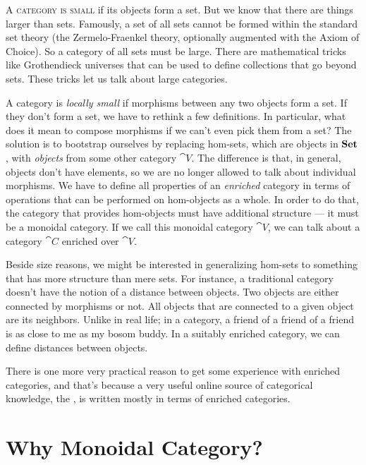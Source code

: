
\lettrine[lhang=0.17]{A}{ category is small} if its objects form a set. But we know that
there are things larger than sets. Famously, a set of all sets cannot be
formed within the standard set theory (the Zermelo-Fraenkel theory,
optionally augmented with the Axiom of Choice). So a category of all
sets must be large. There are mathematical tricks like Grothendieck
universes that can be used to define collections that go beyond sets.
These tricks let us talk about large categories.

A category is \emph{locally small} if morphisms between any two objects
form a set. If they don't form a set, we have to rethink a few
definitions. In particular, what does it mean to compose morphisms if we
can't even pick them from a set? The solution is to bootstrap ourselves
by replacing hom-sets, which are objects in $\mathbf{Set}$, with
\emph{objects} from some other category $\cat{V}$. The difference is
that, in general, objects don't have elements, so we are no longer
allowed to talk about individual morphisms. We have to define all
properties of an \emph{enriched} category in terms of operations that
can be performed on hom-objects as a whole. In order to do that, the
category that provides hom-objects must have additional structure --- it
must be a monoidal category. If we call this monoidal category $\cat{V}$,
we can talk about a category $\cat{C}$ enriched over $\cat{V}$.

Beside size reasons, we might be interested in generalizing hom-sets to
something that has more structure than mere sets. For instance, a
traditional category doesn't have the notion of a distance between
objects. Two objects are either connected by morphisms or not. All
objects that are connected to a given object are its neighbors. Unlike
in real life; in a category, a friend of a friend of a friend is as
close to me as my bosom buddy. In a suitably enriched category, we can
define distances between objects.

There is one more very practical reason to get some experience with
enriched categories, and that's because a very useful online source of
categorical knowledge, the , is written
mostly in terms of enriched categories.

\section{Why Monoidal Category?}

